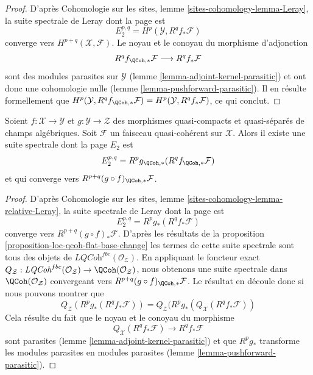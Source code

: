 \begin{proof}
D'après Cohomologie sur les sites, lemme \ref{sites-cohomology-lemma-Leray},
la suite spectrale de Leray dont la page est
$$
E_2^{p, q} = H^p(\mathcal{Y}, R^qf_*\mathcal{F})
$$
converge vers $H^{p + q}(\mathcal{X}, \mathcal{F})$. Le noyau et le conoyau
du morphisme d'adjonction
$$
R^qf_{\QCoh, *}\mathcal{F} \longrightarrow R^qf_*\mathcal{F}
$$
sont des modules parasites sur $\mathcal{Y}$
(lemme \ref{lemma-adjoint-kernel-parasitic})
et ont donc une cohomologie nulle
(lemme \ref{lemma-pushforward-parasitic}).
Il en résulte formellement que
$H^p(\mathcal{Y}, R^qf_{\QCoh, *}\mathcal{F}) =
H^p(\mathcal{Y}, R^qf_*\mathcal{F})$, ce qui conclut.
\end{proof}

\begin{lemma}
\label{lemma-relative-leray}
Soient $f : \mathcal{X} \to \mathcal{Y}$ et $g : \mathcal{Y} \to \mathcal{Z}$
des morphismes quasi-compacts et quasi-séparés de champs algébriques.
Soit $\mathcal{F}$ un faisceau quasi-cohérent sur $\mathcal{X}$. Alors
il existe une suite spectrale dont la page $E_2$ est
$$
E_2^{p, q} = R^pg_{\QCoh, *}(R^qf_{\QCoh, *}\mathcal{F})
$$
et qui converge vers $R^{p + q}(g \circ f)_{\QCoh, *}\mathcal{F}$.
\end{lemma}

\begin{proof}
D'après Cohomologie sur les sites, lemme \ref{sites-cohomology-lemma-relative-Leray},
la suite spectrale de Leray dont la page est
$$
E_2^{p, q} = R^pg_*(R^qf_*\mathcal{F})
$$
converge vers $R^{p + q}(g \circ f)_*\mathcal{F}$. D'après les résultats de la
proposition \ref{proposition-loc-qcoh-flat-base-change}
les termes de cette suite spectrale sont tous des objets de
$\textit{LQCoh}^{fbc}(\mathcal{O}_\mathcal{Z})$. En appliquant le foncteur exact
$Q_\mathcal{Z} : \textit{LQCoh}^{fbc}(\mathcal{O}_\mathcal{Z}) \to
\QCoh(\mathcal{O}_\mathcal{Z})$, nous obtenons une suite spectrale dans
$\QCoh(\mathcal{O}_\mathcal{Z})$ convergeant vers
$R^{p + q}(g \circ f)_{\QCoh, *}\mathcal{F}$. Le résultat
en découle donc si nous pouvons montrer que
$$
Q_\mathcal{Z}(R^pg_*(R^qf_*\mathcal{F})) =
Q_\mathcal{Z}(R^pg_*(Q_\mathcal{X}(R^qf_*\mathcal{F}))
$$
Cela résulte du fait que le noyau et le conoyau du morphisme
$$
Q_\mathcal{X}(R^qf_*\mathcal{F}) \longrightarrow R^qf_*\mathcal{F}
$$
sont parasites (lemme \ref{lemma-adjoint-kernel-parasitic}) et que
$R^pg_*$ transforme les modules parasites en modules parasites
(lemme \ref{lemma-pushforward-parasitic}).
\end{proof}

